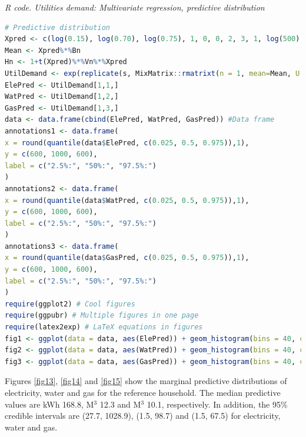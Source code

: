 \begin{enumerate}[leftmargin=*]
\begin{tcolorbox}[enhanced,width=4.67in,center upper,
	fontupper=\large\bfseries,drop shadow southwest,sharp corners]
	\textit{R code. Utilities demand: Multivariate regression, predictive distribution}
	\begin{VF}
		\begin{lstlisting}[language=R]
# Predictive distribution
Xpred <- c(log(0.15), log(0.70), log(0.75), 1, 0, 0, 2, 3, 1, log(500), 1)
Mean <- Xpred%*%Bn
Hn <- 1+t(Xpred)%*%Vn%*%Xpred
UtilDemand <- exp(replicate(s, MixMatrix::rmatrixt(n = 1, mean=Mean, U = Hn, V = Psin, df = an + 1 - M)))
ElePred <- UtilDemand[1,1,]
WatPred <- UtilDemand[1,2,]
GasPred <- UtilDemand[1,3,]
data <- data.frame(cbind(ElePred, WatPred, GasPred)) #Data frame
annotations1 <- data.frame(
x = round(quantile(data$ElePred, c(0.025, 0.5, 0.975)),1),
y = c(600, 1000, 600),
label = c("2.5%:", "50%:", "97.5%:")
)
annotations2 <- data.frame(
x = round(quantile(data$WatPred, c(0.025, 0.5, 0.975)),1),
y = c(600, 1000, 600),
label = c("2.5%:", "50%:", "97.5%:")
)
annotations3 <- data.frame(
x = round(quantile(data$GasPred, c(0.025, 0.5, 0.975)),1),
y = c(600, 1000, 600),
label = c("2.5%:", "50%:", "97.5%:")
)
require(ggplot2) # Cool figures
require(ggpubr) # Multiple figures in one page
require(latex2exp) # LaTeX equations in figures
fig1 <- ggplot(data = data, aes(ElePred)) + geom_histogram(bins = 40, color = "#000000", fill = "#0099F8") + 	xlab("kWh") + ylab("Frequency") +	ggtitle("Electricity") + xlim(0, 1050) + geom_text(data = annotations1, aes(x = x, y = y, label = paste(label, x)), size = 3, fontface = "bold")
fig2 <- ggplot(data = data, aes(WatPred)) + geom_histogram(bins = 40, color = "#000000", fill = "#0099F8") + 	xlab(TeX("$M^3$")) + ylab("Frequency") +	ggtitle("Water") + xlim(0, 100) + geom_text(data = annotations2, aes(x = x, y = y, label = paste(label, x)), size = 3, fontface = "bold")
fig3 <- ggplot(data = data, aes(GasPred)) + geom_histogram(bins = 40, color = "#000000", fill = "#0099F8") + 	xlab(TeX("$M^3$")) + ylab("Frequency") +	ggtitle("Gas") + xlim(0, 80) + geom_text(data = annotations3, aes(x = x, y = y, label = paste(label, x)), size = 3, fontface = "bold")
		\end{lstlisting}
	\end{VF}
\end{tcolorbox} 

Figures \ref{fig13}, \ref{fig14} and \ref{fig15} show the marginal predictive distributions of electricity, water and gas for the reference household. The median predictive values are kWh 168.8, M$^3$ 12.3 and M$^3$ 10.1, respectively. In addition, the 95\% credible intervals are (27.7, 1028.9), (1.5, 98.7) and (1.5, 67.5) for electricity, water and gas.  


\end{enumerate}
